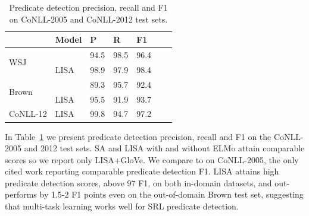 \documentclass[11pt,a4paper]{article}
\begin{document}
\begin{table}
\setlength{\tabcolsep}{5pt}
\begin{tabular}{lllllll}


& Model & P & R & F1 \\ \hline \hline
\multirow{2}{*}{WSJ} & \citet{he2017deep} & 94.5 & 98.5 & 96.4  \\
& LISA & 98.9 &  97.9 & 98.4 \\ \hline

\multirow{2}{*}{Brown} & \citet{he2017deep} & 89.3 & 95.7 & 92.4 \\ 
& LISA & 95.5 &  91.9 &  93.7 \\ \hline

CoNLL-12 & LISA & 99.8 & 94.7 &	97.2 \\ 
\end{tabular}
\caption{Predicate detection precision, recall and F1 on CoNLL-2005 and CoNLL-2012 test sets. \label{tab:preds}}
\end{table}

In Table~\ref{tab:preds} we present predicate detection precision, recall and F1 on the CoNLL-2005 and 2012 test sets. SA and LISA with and without ELMo attain comparable scores so we report only LISA+GloVe. We compare to \citet{he2017deep} on CoNLL-2005, the only cited work reporting comparable predicate detection F1. LISA attains high predicate detection scores, above 97 F1, on both in-domain datasets, and out-performs \citet{he2017deep} by 1.5-2 F1 points even on the out-of-domain Brown test set, suggesting that multi-task learning works well for SRL predicate detection. 
\end{document}
